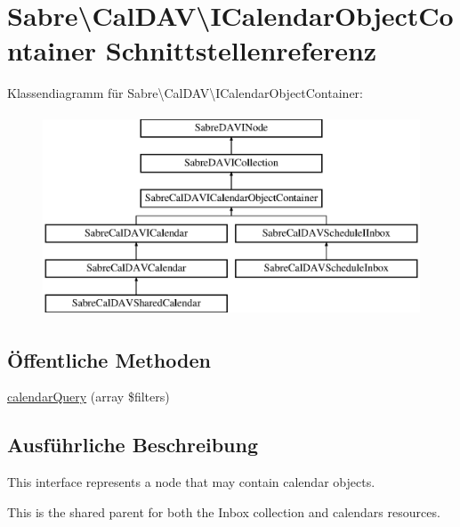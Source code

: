 \hypertarget{interface_sabre_1_1_cal_d_a_v_1_1_i_calendar_object_container}{}\section{Sabre\textbackslash{}Cal\+D\+AV\textbackslash{}I\+Calendar\+Object\+Container Schnittstellenreferenz}
\label{interface_sabre_1_1_cal_d_a_v_1_1_i_calendar_object_container}
Klassendiagramm für Sabre\textbackslash{}Cal\+D\+AV\textbackslash{}I\+Calendar\+Object\+Container\+:\begin{figure}[H]
\begin{center}
\leavevmode
\includegraphics[height=6.000000cm]{interface_sabre_1_1_cal_d_a_v_1_1_i_calendar_object_container}
\end{center}
\end{figure}
\subsection*{Öffentliche Methoden}
\begin{DoxyCompactItemize}
\item 
\mbox{\hyperlink{interface_sabre_1_1_cal_d_a_v_1_1_i_calendar_object_container_abb74b291f0e04c59cf0ca1003d21ba77}{calendar\+Query}} (array \$filters)
\end{DoxyCompactItemize}


\subsection{Ausführliche Beschreibung}
This interface represents a node that may contain calendar objects.

This is the shared parent for both the Inbox collection and calendars resources.

